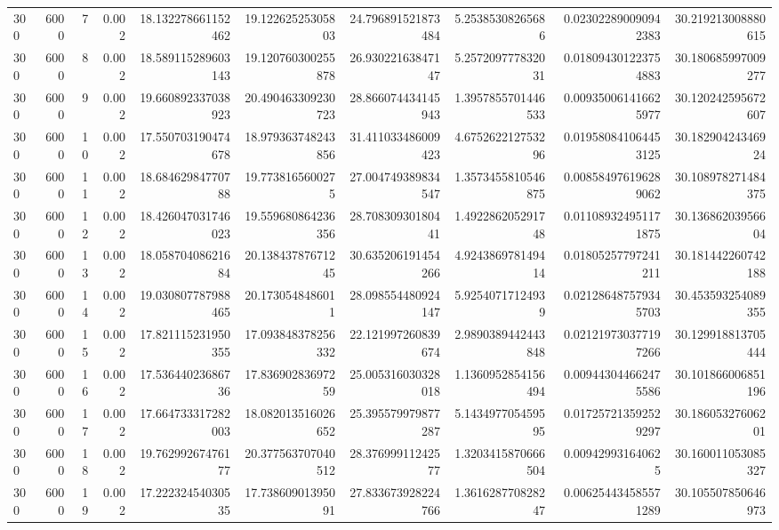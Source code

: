 \begin{tabular}{lrrrrrrrrr}
300 & 6000 & 7 & 0.002 & 18.132278661152462 & 19.12262525305803 & 24.796891521873484 & 5.25385308265686 & 0.023022890090942383 & 30.219213008880615 \\
300 & 6000 & 8 & 0.002 & 18.589115289603143 & 19.120760300255878 & 26.93022163847147 & 5.257209777832031 & 0.018094301223754883 & 30.180685997009277 \\
300 & 6000 & 9 & 0.002 & 19.660892337038923 & 20.490463309230723 & 28.866074434145943 & 1.3957855701446533 & 0.009350061416625977 & 30.120242595672607 \\
300 & 6000 & 10 & 0.002 & 17.550703190474678 & 18.979363748243856 & 31.411033486009423 & 4.675262212753296 & 0.019580841064453125 & 30.18290424346924 \\
300 & 6000 & 11 & 0.002 & 18.68462984770788 & 19.7738165600275 & 27.004749389834547 & 1.3573455810546875 & 0.008584976196289062 & 30.108978271484375 \\
300 & 6000 & 12 & 0.002 & 18.426047031746023 & 19.559680864236356 & 28.70830930180441 & 1.492286205291748 & 0.011089324951171875 & 30.13686203956604 \\
300 & 6000 & 13 & 0.002 & 18.05870408621684 & 20.13843787671245 & 30.635206191454266 & 4.924386978149414 & 0.01805257797241211 & 30.181442260742188 \\
300 & 6000 & 14 & 0.002 & 19.030807787988465 & 20.1730548486011 & 28.098554480924147 & 5.92540717124939 & 0.021286487579345703 & 30.453593254089355 \\
300 & 6000 & 15 & 0.002 & 17.821115231950355 & 17.093848378256332 & 22.121997260839674 & 2.9890389442443848 & 0.021219730377197266 & 30.129918813705444 \\
300 & 6000 & 16 & 0.002 & 17.53644023686736 & 17.83690283697259 & 25.005316030328018 & 1.1360952854156494 & 0.009443044662475586 & 30.101866006851196 \\
300 & 6000 & 17 & 0.002 & 17.664733317282003 & 18.082013516026652 & 25.395579979877287 & 5.143497705459595 & 0.017257213592529297 & 30.18605327606201 \\
300 & 6000 & 18 & 0.002 & 19.76299267476177 & 20.377563707040512 & 28.37699911242577 & 1.3203415870666504 & 0.009429931640625 & 30.160011053085327 \\
300 & 6000 & 19 & 0.002 & 17.22232454030535 & 17.73860901395091 & 27.833673928224766 & 1.361628770828247 & 0.006254434585571289 & 30.105507850646973 \\
\hline
\end{tabular}
